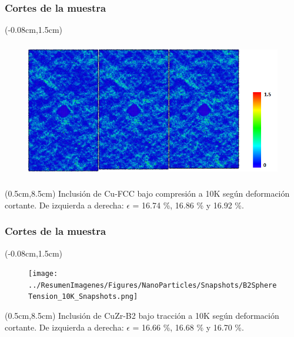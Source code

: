 \begin{frame}
  \frametitle{Cortes de la muestra}
  \begin{textblock*}{12.6cm}(-0.08cm,1.5cm) 
    \begin{figure}[htp]
     \centering
     \includegraphics[height=6cm]{../ResumenImagenes/Figures/NanoParticles/Snapshots/cuSphereCompression_10K_Snapshots.png}
    \end{figure}
  \end{textblock*}
  \begin{textblock*}{12cm}(0.5cm,8.5cm) 
    \centering
      \small{Inclusi\'on de Cu-FCC bajo compresi\'on a 10K según deformaci\'on cortante. De izquierda a derecha: $\epsilon$ = 16.74 \%, 16.86 \% y 16.92 \%.}
    \end{textblock*}
\end{frame}

\begin{frame}
  \frametitle{Cortes de la muestra}
  \begin{textblock*}{12.6cm}(-0.08cm,1.5cm) 
    \begin{figure}[htp]
     \centering
     \texttt{[image: ../ResumenImagenes/Figures/NanoParticles/Snapshots/B2SphereTension\_10K\_Snapshots.png]}
    \end{figure}
  \end{textblock*}
  \begin{textblock*}{12cm}(0.5cm,8.5cm) 
    \centering
      \small{Inclusión de CuZr-B2 bajo tracción a 10K según deformación cortante. De izquierda a derecha: $\epsilon$ = 16.66 \%, 16.68 \% y 16.70 \%.}
    \end{textblock*}
\end{frame}

